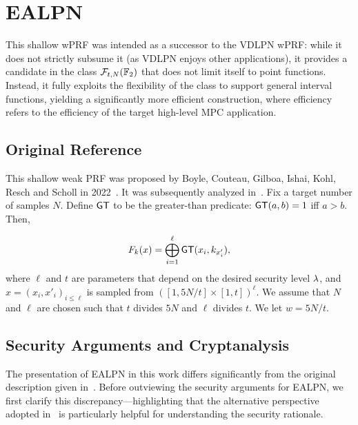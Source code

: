 \section{EALPN}
\label{sec:ealpn}

This shallow wPRF was intended as a successor to the {\sf VDLPN} wPRF: while it does not strictly subsume it (as {\sf VDLPN} enjoys other applications), it provides a candidate in the class $\mathcal{F}_{t,N}(\mathbb{F}_2)$ that does not limit itself to point functions. Instead, it fully exploits the flexibility of the class to support general interval functions, yielding a significantly more efficient construction, where efficiency refers to the efficiency of the target high-level MPC application.

\subsection{Original Reference}
\label{subsec:original-reference-ealpn}

This shallow weak PRF was proposed by Boyle, Couteau, Gilboa, Ishai, Kohl, Resch and Scholl in 2022~\cite{C:BCGIKR22}. It was subsequently analyzed in~\cite{C:RagRinTan23}. Fix a target number of samples $N$. Define $\mathsf{GT}$ to be the greater-than predicate: $\mathsf{GT}(a,b) = 1$ iff $a > b$. Then,

\begin{equation}\label{eq:ealpn}
F_k(x) = \bigoplus_{i=1}^\ell \mathsf{GT}(x_i, k_{x'_i}),
\end{equation}
where $\ell$ and $t$ are parameters that depend on the desired security level $\lambda$, and $x = (x_i,x'_i)_{i \leq \ell}$ is sampled from $([1,5N/t]\times [1,t])^\ell$. We assume that $N$ and $\ell$ are chosen such that $t$ divides $5N$ and $\ell$ divides $t$. We let $w = 5N/t$.

\subsection{Security Arguments and Cryptanalysis}


The presentation of {\sf EALPN} in this work differs significantly from the original description given in~\cite{C:BCGIKR22}. Before outviewing the security arguments for {\sf EALPN}, we first clarify this discrepancy—highlighting that the alternative perspective adopted in~\cite{C:BCGIKR22} is particularly helpful for understanding the security rationale.


